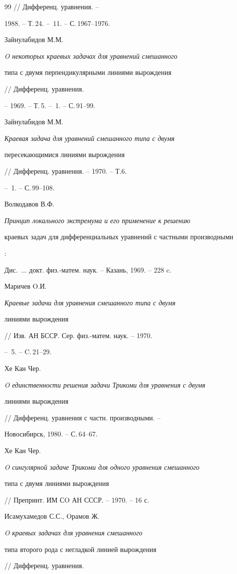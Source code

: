 \begin{thebibliography}{99}
// Дифференц. уравнения. -- 


1988. -- Т.\,24. -- \No\,11. -- С.\,1967--1976.




Зайнулабидов М.М. {\em O некоторых краевых задачах для уравнений смешанного


типа с двумя перпендикулярными линиями вырождения} // Дифференц. уравнения.


-- 1969. -- Т.\,5. -- \No\,1. -- С.\,91--99.




Зайнулабидов М.М. {\em Краевая задача для уравнений смешанного типа с двумя 


пересекающимися линиями вырождения} // Дифференц. уравнения. -- 1970. -- Т.6.


-- \No\,1. -- С.\,99--108. 




Волкодавов В.Ф. {\em Принцип локального экстремума и его применение к решению 


краевых задач для дифференциальных уравнений с частными производными}:


Дис.~$\dotsc$ докт. физ.-матем. наук. -- Казань, 1969. -- 228 c.




Маричев O.И. {\em Краевые задачи для уравнения смешанного типа с двумя


линиями вырождения} // Изв. АН БССР. Сер. физ.-матем. наук. -- 1970.


-- \No\,5. -- C.\,21--29.




Хе Кан Чер. {\em O единственности решения задачи Трикоми для уравнения с двумя 


линиями вырождения} // Дифференц. уравнения с частн. производными. -- 


Новосибирск, 1980. -- С.\,64--67.




Хе Кан Чер. {\em O сингулярной задаче Трикоми для одного уравнения смешанного 


типа с двумя линиями вырождения} // Препринт. ИМ СO АН СССР. -- 1970. -- 16 с.




Исамухамедов С.С., Oрамов Ж. {\em O краевых задачах для уравнения смешанного


типа второго рода с негладкой линией вырождения} // Дифференц. уравнения.



\end{thebibliography}
